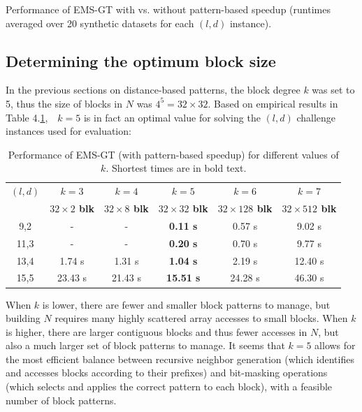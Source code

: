 \documentclass[oneside,12pt]{DISCSthesis}
\begin{document}
{\begin{table}[h]
			\caption{\small Performance of EMS-GT with vs. without pattern-based speedup
			(runtimes averaged over 20 synthetic datasets for each $(l,d)$ instance).}
			\end{table}

		\subsection{Determining the optimum block size}
			In the previous sections on distance-based patterns, the block degree $k$ was set to 5, thus the size of blocks in $N$ was $4^5 = 32 \times 32$. Based on empirical results in Table 4.\ref{tbl:block-degree-tests},\ \ $k=5$ is in fact an optimal value for solving the $(l,d)$ challenge instances used for evaluation:\newline

			\begin{table}[h] %
				\small
				\renewcommand{\arraystretch}{1.3}
				\label{tbl:block-degree-tests}
				\centering
				\begin{tabular}{|c|c|c|c|c|c|}
				\hline
				\bfseries\boldmath $(l,d)$ &
				\bfseries\boldmath $k=3$ &
				\bfseries\boldmath $k=4$ &
				\bfseries\boldmath $k=5$ &
				\bfseries\boldmath $k=6$ &
				\bfseries\boldmath $k=7$ \\

				\bfseries &
				\bfseries\boldmath $32 \times   2$ blk &
				\bfseries\boldmath $32 \times   8$ blk &
				\bfseries\boldmath $32 \times  32$ blk &
				\bfseries\boldmath $32 \times 128$ blk &
				\bfseries\boldmath $32 \times 512$ blk \\
				\hline
				 9,2 	&    -   &    -     & {\bf  0.11 s} &  0.57 s &  9.02 s \\
				11,3 	&    -   &    -     & {\bf  0.20 s} &  0.70 s &  9.77 s \\
				13,4 	&  1.74 s &  1.31 s & {\bf  1.04 s} &  2.19 s & 12.40 s \\
				15,5 	& 23.43 s & 21.43 s & {\bf 15.51 s} & 24.28 s & 46.30 s \\
				\hline
				\end{tabular}
				\centering
				\caption{\small Performance of EMS-GT (with pattern-based speedup) for different values of $k$. Shortest times are in bold text.}
				\end{table}

			When $k$ is lower, there are fewer and smaller block patterns to manage, but building $N$ requires many highly scattered array accesses to small blocks. When $k$ is higher, there are larger contiguous blocks and thus fewer accesses in $N$, but also a much larger set of block patterns to manage. It seems that $k=5$ allows for the most efficient balance between recursive neighbor generation (which identifies and accesses blocks according to their prefixes) and bit-masking operations (which selects and applies the correct pattern to each block), with a feasible number of block patterns. 

}
\end{document}
